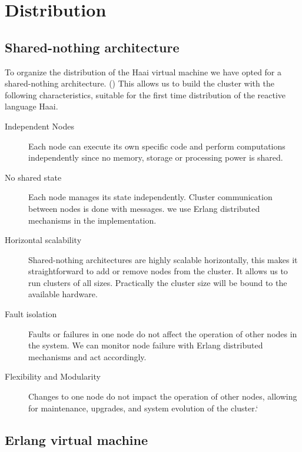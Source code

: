 \documentclass[a4paper]{book}
\begin{document}
\chapter{Distribution}
\section{Shared-nothing architecture}
To organize the distribution of the Haai virtual machine we have opted for a shared-nothing architecture. (\cite{DBLP:journals/debu/Stonebraker86}) This allows us to build the cluster with the following characteristics, suitable for the first time distribution of the reactive language Haai.
\begin{description}
	\item[Independent Nodes] Each node can execute its own specific code and perform computations independently since no memory, storage or processing power is shared.
	\item[No shared state] Each node manages its state independently. Cluster communication between nodes is done with messages. we use Erlang distributed mechanisms in the implementation.
	\item[Horizontal scalability] Shared-nothing architectures are highly scalable horizontally, this makes it straightforward to add or remove nodes from the cluster. It allows us to run clusters of all sizes. Practically the cluster size will be bound to the available hardware.
	\item[Fault isolation] Faults or failures in one node do not affect the operation of other nodes in the system. We can monitor node failure with Erlang distributed mechanisms and act accordingly. 
	\item[Flexibility and Modularity] Changes to one node do not impact the operation of other nodes, allowing for maintenance, upgrades, and system evolution of the cluster.` 
\end{description}

\section{Erlang virtual machine}
\end{document}
